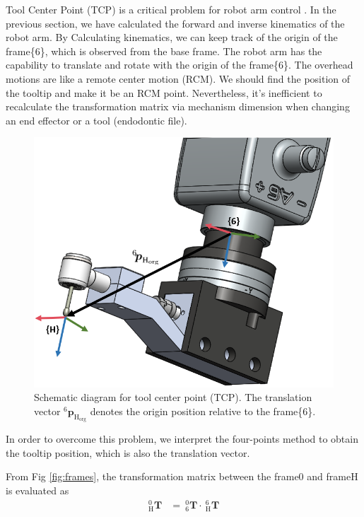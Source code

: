 \hspace*{6mm}Tool Center Point (TCP) is a critical problem for robot arm control \cite{yang2017four}. In the previous section, we have calculated the forward and inverse kinematics of the robot arm. By Calculating kinematics, we can keep track of the origin of the frame\{6\}, which is observed from the base frame. The robot arm has the capability to translate and rotate with the origin of the frame\{6\}. The overhead motions are like a remote center motion (RCM). We should find the position of the tooltip and make it be an RCM point. Nevertheless, it's inefficient to recalculate the transformation matrix via mechanism dimension when changing an end effector or a tool (endodontic file).
\begin{figure}[htbp]
\begin{center}
\includegraphics[width=0.7\linewidth]{Images/TCP.png}
\caption{
Schematic diagram for tool center point (TCP). The translation vector $^\mathrm{6}\!\boldsymbol{p}_\mathrm{H_{org}}$ denotes the origin position relative to the frame\{6\}.
}\label{fig:tcp}
\end{center}
\end{figure}
\par
In order to overcome this problem, we interpret the four-points method to obtain the tooltip position, which is also the translation vector.
\par\noindent
From Fig \ref{fig:frames}, the transformation matrix between the frame{0} and frame{H} is evaluated as 
\begin{equation}
\begin{split}
_{\mathrm{H}}^{\mathrm{0}}\mathbf{T} &=\ _{\mathrm{6}}^{\mathrm{0}}\mathbf{T}\cdot \ _{\mathrm{H}}^{\mathrm{6}}\mathbf{T}\\
\end{split}
\end{equation}		
